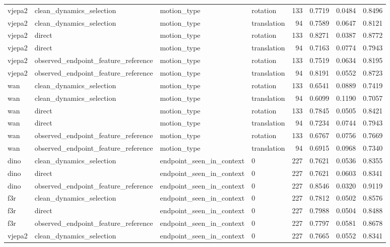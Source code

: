 \begin{tabular}{llllrrrr}
vjepa2 & clean\_dynamics\_selection & motion\_type & rotation & 133 & 0.7719 & 0.0484 & 0.8496 \\
vjepa2 & clean\_dynamics\_selection & motion\_type & translation & 94 & 0.7589 & 0.0647 & 0.8121 \\
vjepa2 & direct & motion\_type & rotation & 133 & 0.8271 & 0.0387 & 0.8772 \\
vjepa2 & direct & motion\_type & translation & 94 & 0.7163 & 0.0774 & 0.7943 \\
vjepa2 & observed\_endpoint\_feature\_reference & motion\_type & rotation & 133 & 0.7519 & 0.0634 & 0.8195 \\
vjepa2 & observed\_endpoint\_feature\_reference & motion\_type & translation & 94 & 0.8191 & 0.0552 & 0.8723 \\
wan & clean\_dynamics\_selection & motion\_type & rotation & 133 & 0.6541 & 0.0889 & 0.7419 \\
wan & clean\_dynamics\_selection & motion\_type & translation & 94 & 0.6099 & 0.1190 & 0.7057 \\
wan & direct & motion\_type & rotation & 133 & 0.7845 & 0.0505 & 0.8421 \\
wan & direct & motion\_type & translation & 94 & 0.7234 & 0.0744 & 0.7943 \\
wan & observed\_endpoint\_feature\_reference & motion\_type & rotation & 133 & 0.6767 & 0.0756 & 0.7669 \\
wan & observed\_endpoint\_feature\_reference & motion\_type & translation & 94 & 0.6915 & 0.0968 & 0.7340 \\
dino & clean\_dynamics\_selection & endpoint\_seen\_in\_context & 0 & 227 & 0.7621 & 0.0536 & 0.8355 \\
dino & direct & endpoint\_seen\_in\_context & 0 & 227 & 0.7621 & 0.0603 & 0.8341 \\
dino & observed\_endpoint\_feature\_reference & endpoint\_seen\_in\_context & 0 & 227 & 0.8546 & 0.0320 & 0.9119 \\
f3r & clean\_dynamics\_selection & endpoint\_seen\_in\_context & 0 & 227 & 0.7812 & 0.0502 & 0.8576 \\
f3r & direct & endpoint\_seen\_in\_context & 0 & 227 & 0.7988 & 0.0504 & 0.8488 \\
f3r & observed\_endpoint\_feature\_reference & endpoint\_seen\_in\_context & 0 & 227 & 0.7797 & 0.0581 & 0.8678 \\
vjepa2 & clean\_dynamics\_selection & endpoint\_seen\_in\_context & 0 & 227 & 0.7665 & 0.0552 & 0.8341 \\

\end{tabular}
